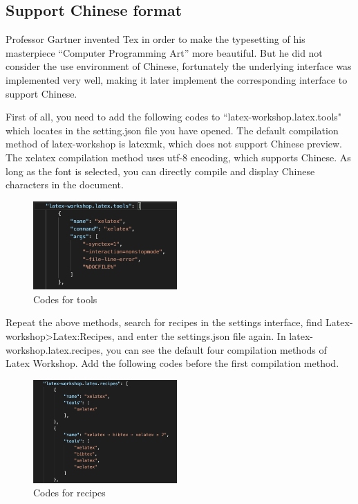 \documentclass[conference]{IEEEtran}
\begin{document}
\subsection{Support Chinese format}
Professor Gartner invented Tex in order to make the typesetting of his masterpiece ``Computer Programming Art'' more beautiful. 
But he did not consider the use environment of Chinese, 
fortunately the underlying interface was implemented very well, 
making it later implement the corresponding interface to support Chinese.

First of all, you need to add the following codes to ``latex-workshop.latex.tools" which locates in the setting.json file you have opened.
The default compilation method of latex-workshop is latexmk, which does not support Chinese preview. 
The xelatex compilation method uses utf-8 encoding, which supports Chinese. 
As long as the font is selected, you can directly compile and display Chinese characters in the document.

\begin{figure}[htbp]
    \centerline{\includegraphics[width=0.49\textwidth]{tool_xelatex.png}}
    \caption{Codes for tools}
    \label{fig2}
\end{figure}

Repeat the above methods, 
search for recipes in the settings interface, 
find Latex-workshop>Latex:Recipes, 
and enter the settings.json file again. 
In latex-workshop.latex.recipes, 
you can see the default four compilation methods of Latex Workshop. 
Add the following codes before the first compilation method.

\begin{figure}[htbp]
    \centerline{\includegraphics[width=0.49\textwidth]{recipes_confi.png}}
    \caption{Codes for recipes}
    \label{fig3}
\end{figure}
\end{document}
